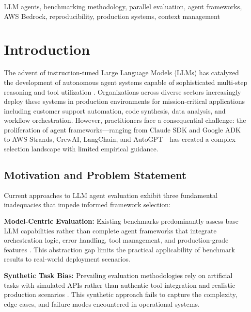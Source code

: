 \documentclass[sigconf,nonacm]{acmart}
\begin{document}
\begin{keywords}
LLM agents, benchmarking methodology, parallel evaluation, agent frameworks, AWS Bedrock, reproducibility, production systems, context management
\end{keywords}

\maketitle

\section{Introduction}

The advent of instruction-tuned Large Language Models (LLMs) has catalyzed the development of autonomous agent systems capable of sophisticated multi-step reasoning and tool utilization \cite{schick2024toolformer,qin2023tool}. Organizations across diverse sectors increasingly deploy these systems in production environments for mission-critical applications including customer support automation, code synthesis, data analysis, and workflow orchestration. However, practitioners face a consequential challenge: the proliferation of agent frameworks—ranging from Claude SDK and Google ADK to AWS Strands, CrewAI, LangChain, and AutoGPT—has created a complex selection landscape with limited empirical guidance.

\subsection{Motivation and Problem Statement}

Current approaches to LLM agent evaluation exhibit three fundamental inadequacies that impede informed framework selection:

\textbf{Model-Centric Evaluation:} Existing benchmarks predominantly assess base LLM capabilities rather than complete agent frameworks that integrate orchestration logic, error handling, tool management, and production-grade features \cite{liu2023agentbench}. This abstraction gap limits the practical applicability of benchmark results to real-world deployment scenarios.

\textbf{Synthetic Task Bias:} Prevailing evaluation methodologies rely on artificial tasks with simulated APIs rather than authentic tool integration and realistic production scenarios \cite{xu2023wizardlm}. This synthetic approach fails to capture the complexity, edge cases, and failure modes encountered in operational systems.
\end{document}
